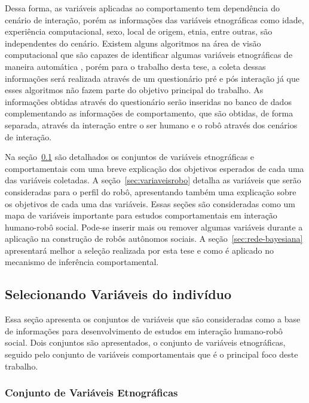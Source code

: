 Dessa forma, as variáveis aplicadas ao comportamento tem dependência do cenário de interação, porém as informações das variáveis etnográficas como idade, experiência computacional, sexo, local de origem, etnia, entre outras, são independentes do cenário. Existem alguns algoritmos na área de visão computacional que são capazes de identificar algumas variáveis etnográficas de maneira automática \cite{yang:2007, shan:2012, ylioinas:2012, samadi:2013, amaral:2014}, porém para o trabalho desta tese, a coleta dessas informações será realizada através de um questionário pré e pós interação já que esses algoritmos não fazem parte do objetivo principal do trabalho. As informações obtidas através do questionário serão inseridas no banco de dados complementando as informações de comportamento, que são obtidas, de forma separada, através da interação entre o ser humano e o robô através dos cenários de interação.

Na seção~\ref{sec:variaveisindivíduo} são detalhados os conjuntos de variáveis etnográficas e comportamentais com uma breve explicação dos objetivos esperados de cada uma das variáveis coletadas. A seção~\ref{sec:variaveisrobo} detalha as variáveis que serão consideradas para o perfil do robô, apresentando também uma explicação sobre os objetivos de cada uma das variáveis. Essas seções são consideradas como um mapa de variáveis importante para estudos comportamentais em interação humano-robô social. Pode-se inserir mais ou remover algumas variáveis durante a aplicação na construção de robôs autônomos sociais. A seção~\ref{sec:rede-bayesiana} apresentará melhor a seleção realizada por esta tese e como é aplicado no mecanismo de inferência comportamental.

\subsection{Selecionando Variáveis do indivíduo}
\label{sec:variaveisindivíduo}

Essa seção apresenta os conjuntos de variáveis que são consideradas como a base de informações para desenvolvimento de estudos em interação humano-robô social. Dois conjuntos são apresentados, o conjunto de variáveis etnográficas, seguido pelo conjunto de variáveis comportamentais que é o principal foco deste trabalho.

\subsubsection{Conjunto de Variáveis Etnográficas}
\label{sec:variaveisetnograficas}


